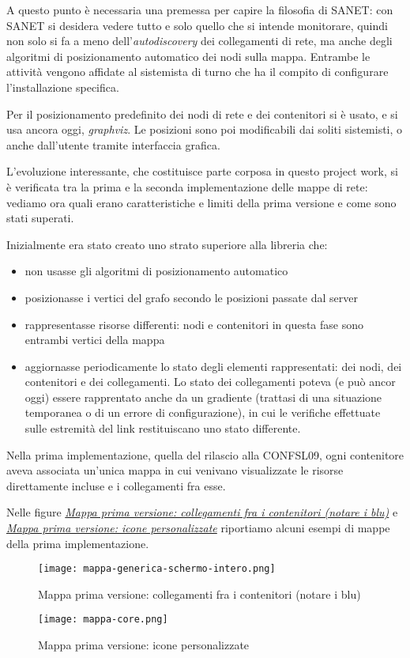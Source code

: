\documentclass[a4wide,10pt,italian]{manual}
\begin{document}
A questo punto è necessaria una premessa per capire la filosofia di SANET:
con SANET si desidera vedere tutto e solo quello che si intende monitorare,
quindi non solo si fa a meno dell'\emph{autodiscovery} dei collegamenti di rete,
ma anche degli algoritmi di posizionamento automatico dei nodi sulla mappa. Entrambe le attività
vengono affidate al sistemista di turno che ha il compito di configurare l'installazione specifica.

Per il posizionamento predefinito dei nodi di rete e dei contenitori
si è usato, e si usa ancora oggi, \emph{graphviz}.
Le posizioni sono poi modificabili dai soliti sistemisti, o anche dall'utente tramite interfaccia grafica.

L'evoluzione interessante, che costituisce parte corposa in questo project work, si è verificata tra la prima
e la seconda implementazione delle mappe di rete: vediamo ora quali erano caratteristiche e limiti della prima
versione e come sono stati superati.

Inizialmente era stato creato uno strato superiore alla libreria che:
\begin{itemize}
\item {} 
non usasse gli algoritmi di posizionamento automatico

\item {} 
posizionasse i vertici del grafo secondo le posizioni passate dal server

\item {} 
rappresentasse risorse differenti: nodi e contenitori in questa fase sono entrambi vertici della mappa

\item {} 
aggiornasse periodicamente lo stato degli elementi rappresentati: dei nodi, dei contenitori e dei collegamenti.
Lo stato dei collegamenti poteva (e può ancor oggi) essere rapprentato anche da un gradiente (trattasi di una
situazione temporanea o di un errore di configurazione),
in cui le verifiche effettuate sulle estremità del link restituiscano uno stato differente.

\end{itemize}

Nella prima implementazione, quella del rilascio alla CONFSL09, ogni contenitore
aveva associata un'unica mappa in cui venivano visualizzate le risorse direttamente incluse
e i collegamenti fra esse.

Nelle figure \hyperlink{map-generic}{\emph{Mappa prima versione: collegamenti fra i contenitori (notare i blu)}} e \hyperlink{map-core}{\emph{Mappa prima versione: icone personalizzate}} riportiamo alcuni esempi di mappe della prima implementazione.
\hypertarget{map-generic}{}\begin{figure}[htbp]
\centering

\texttt{[image: mappa-generica-schermo-intero.png]}
\caption{Mappa prima versione: collegamenti fra i contenitori (notare i blu)}\end{figure}
\hypertarget{map-core}{}\begin{figure}[htbp]
\centering

\texttt{[image: mappa-core.png]}
\caption{Mappa prima versione: icone personalizzate}\end{figure}
\end{document}
